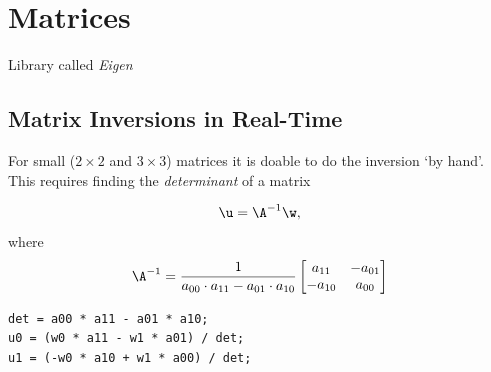 \section{Matrices}

Library called \textit{Eigen} \cite{Eigen}

\subsection{Matrix Inversions in Real-Time}\label{sec:RTmatrixInversion}
For small ($2\times 2$ and $3\times 3$) matrices it is doable to do the inversion `by hand'. This requires finding the \textit{determinant} of a matrix

\begin{equation*}
    \u = \A^{-1}\w, 
\end{equation*}
where
\begin{equation}
    \A^{-1} = \frac{1}{a_{00}\cdot a_{11} - a_{01}\cdot a_{10}}
    \begin{bmatrix}
        a_{11} & -a_{01}\\
        -a_{10} & a_{00} 
    \end{bmatrix}
\end{equation}

\setlstCpp
\begin{lstlisting}
det = a00 * a11 - a01 * a10;
u0 = (w0 * a11 - w1 * a01) / det;
u1 = (-w0 * a10 + w1 * a00) / det;
\end{lstlisting}